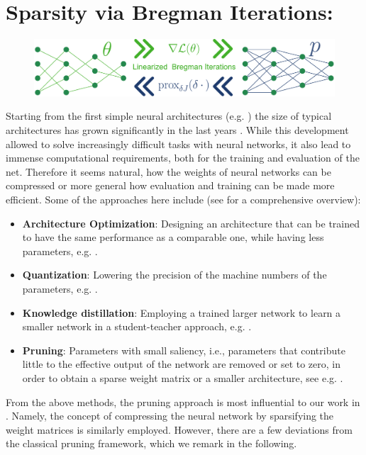 \section{Sparsity via Bregman Iterations: \cite{bungert2022bregman}}\label{sec:BREG}
%
\begin{figure}
\centering
\includegraphics[width=.5\textwidth]{atelier/Breg_dist/BregmanPosterCartoon.pdf}
\end{figure}
%
%
Starting from the first simple neural architectures (e.g. \cite{rosenblatt1958perceptron}) the size of typical architectures has grown significantly in the last years \cite{hoefler2021sparsity}. While this development allowed to solve increasingly difficult tasks with neural networks, it also lead to immense computational requirements, both for the training and evaluation of the net. Therefore it seems natural, how the weights of neural networks can be compressed or more general how evaluation and training can be made more efficient. Some of the approaches here include (see \cite{gholami2021survey} for a comprehensive overview):
%
\begin{itemize}
\item \textbf{Architecture Optimization}: Designing an architecture that can be trained to have the same performance as a comparable one, while having less parameters, e.g. \cite{elsken2019neural, howard2017mobilenets}.
%
\item \textbf{Quantization}: Lowering the precision of the machine numbers of the parameters, e.g. \cite{banner2018scalable, courbariaux2014training}.
%
\item \textbf{Knowledge distillation}: Employing a trained larger network to learn a smaller network in a student-teacher approach, e.g. \cite{schmidhuber1992learning, hinton2015distilling}.
%
\item \textbf{Pruning}: Parameters with small saliency, i.e., parameters that contribute little to the effective output of the network are removed or set to zero, in order to obtain a sparse weight matrix or a smaller architecture, see e.g. \cite{lecun1989optimal, hassibi1993optimal}.
\end{itemize}
%
%
From the above methods, the pruning approach is most influential to our work in \cite{bungert2022bregman}. Namely, the concept of compressing the neural network by sparsifying the weight matrices is similarly employed. However, there are a few deviations from the classical pruning framework, which we remark in the following.

